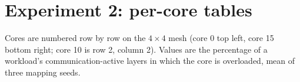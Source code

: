 \chapter{Experiment 2: per-core tables}
\label{app:percore}
Cores are numbered row by row on the $4\times4$ mesh (core 0 top left, core 15 bottom right; core 10 is row 2, column 2). Values are the percentage of a workload's communication-active layers in which the core is overloaded, mean of three mapping seeds.




